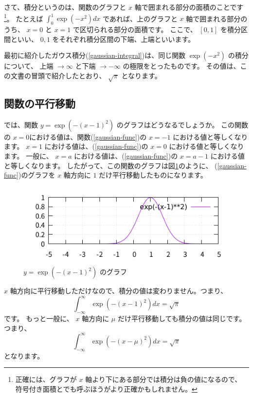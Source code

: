 \documentclass[uplatex,dvipdfmx]{jsarticle}
\begin{document}
  さて、積分というのは、関数のグラフと $x$ 軸で囲まれる部分の面積のことです
  \footnote{
    正確には、グラフが $x$ 軸より下にある部分では積分は負の値になるので、
    符号付き面積とでも呼ぶほうがより正確かもしれません。
  }。
  たとえば $\int_{0}^{1} \exp(-x^2)dx$ であれば、上のグラフと $x$ 軸で囲まれる部分のうち、
  $x = 0$ と $x = 1$ で区切られる部分の面積です。
  ここで、 $[0, 1]$ を積分区間といい、 $0, 1$ をそれぞれ積分区間の下端、上端といいます。

  最初に紹介したガウス積分(\ref{gaussian-integral})は、同じ関数 $\exp(-x^2)$ の積分について、
  上端 $\rightarrow \infty$ と下端 $\rightarrow -\infty$ の極限をとったものです。
  その値は、この文書の冒頭で紹介したとおり、 $\sqrt{\pi}$ となります。

\subsection{関数の平行移動}
  では、関数 $y = \exp(-(x-1)^2)$ のグラフはどうなるでしょうか。
  この関数の $x = 0$における値は、関数(\ref{gaussian-func})の $x = -1$ における値と等しくなります。
  $x = 1$ における値は、(\ref{gaussian-func})の $x = 0$ における値と等しくなります。
  一般に、 $x = a$ における値は、(\ref{gaussian-func})の $x = a - 1$ における値と等しくなります。
  したがって、この関数のグラフは図\ref{gaussian2}のように、
  (\ref{gaussian-func})のグラフを $x$ 軸方向に $1$ だけ平行移動したものになります。
  \begin{figure}
    \centering
    \includegraphics[width=15cm]{gaussian2.png}
    \caption{$y = \exp(-(x-1)^2)$ のグラフ}
    \label{gaussian2}
  \end{figure}
  $x$ 軸方向に平行移動しただけなので、積分の値は変わりません。つまり、
  \[
    \int_{-\infty}^{\infty} \exp(-(x-1)^2) dx = \sqrt{\pi}
  \]
  です。
  もっと一般に、 $x$ 軸方向に $\mu$ だけ平行移動しても積分の値は同じです。つまり、
  \[
    \int_{-\infty}^{\infty} \exp(-(x-\mu)^2) dx = \sqrt{\pi}
  \]
  となります。
\end{document}
